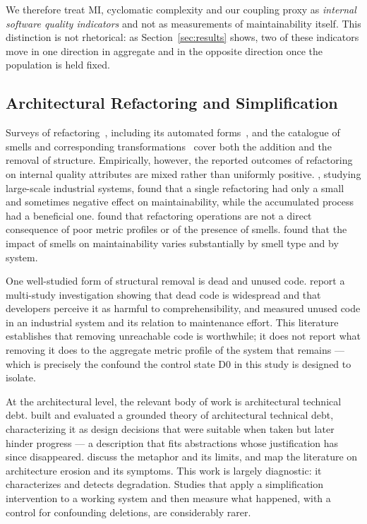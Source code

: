 \documentclass[pdflatex,sn-basic]{sn-jnl}
\begin{document}
We therefore treat MI, cyclomatic complexity and our coupling proxy as \emph{internal software quality indicators} and not as measurements of maintainability itself. This distinction is not rhetorical: as Section~\ref{sec:results} shows, two of these indicators move in one direction in aggregate and in the opposite direction once the population is held fixed.

\subsection{Architectural Refactoring and Simplification}

Surveys of refactoring~\citep{mens2004}, including its automated forms~\citep{baqais2020}, and the catalogue of smells and corresponding transformations~\citep{fowler2018} cover both the addition and the removal of structure. Empirically, however, the reported outcomes of refactoring on internal quality attributes are mixed rather than uniformly positive. \citet{szoke2017}, studying large-scale industrial systems, found that a single refactoring had only a small and sometimes negative effect on maintainability, while the accumulated process had a beneficial one. \citet{bavota2015} found that refactoring operations are not a direct consequence of poor metric profiles or of the presence of smells. \citet{palomba2018} found that the impact of smells on maintainability varies substantially by smell type and by system.

One well-studied form of structural removal is dead and unused code. \citet{romano2020} report a multi-study investigation showing that dead code is widespread and that developers perceive it as harmful to comprehensibility, and \citet{eder2012} measured unused code in an industrial system and its relation to maintenance effort. This literature establishes that removing unreachable code is worthwhile; it does not report what removing it does to the aggregate metric profile of the system that remains --- which is precisely the confound the control state D0 in this study is designed to isolate.

At the architectural level, the relevant body of work is architectural technical debt. \citet{verdecchia2020,verdecchia2021} built and evaluated a grounded theory of architectural technical debt, characterizing it as design decisions that were suitable when taken but later hinder progress --- a description that fits abstractions whose justification has since disappeared. \citet{kruchten2012} discuss the metaphor and its limits, and \citet{li2022} map the literature on architecture erosion and its symptoms. This work is largely diagnostic: it characterizes and detects degradation. Studies that apply a simplification intervention to a working system and then measure what happened, with a control for confounding deletions, are considerably rarer.
\end{document}
